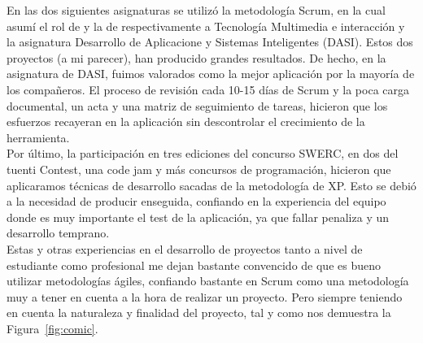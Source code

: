 En las dos siguientes asignaturas se utilizó la metodología Scrum, en
la cual asumí el rol de  y la de 
respectivamente a Tecnología Multimedia e interacción y la asignatura
Desarrollo de Aplicacione y Sistemas Inteligentes (DASI). Estos dos
proyectos (a mi parecer), han producido grandes resultados. De hecho,
en la asignatura de DASI, fuimos valorados como la mejor aplicación
por la mayoría de los compañeros. El proceso de revisión cada 10-15
días de Scrum y la poca carga documental, un acta y una matriz de
seguimiento de tareas, hicieron que los esfuerzos recayeran en la
aplicación sin descontrolar el crecimiento de la herramienta.\\

Por último, la participación en tres ediciones del concurso SWERC, en
dos del tuenti Contest, una code jam y más concursos de programación,
hicieron que aplicaramos técnicas de desarrollo sacadas de la
metodología de XP. Esto se debió a la necesidad de producir enseguida,
confiando en la experiencia del equipo donde es muy importante el test
de la aplicación, ya que fallar penaliza y un desarrollo temprano.\\

Estas y otras experiencias en el desarrollo de proyectos tanto a nivel
de estudiante como profesional me dejan bastante convencido de que es
bueno utilizar metodologías ágiles, confiando bastante en Scrum como
una metodología muy a tener en cuenta a la hora de realizar un
proyecto. Pero siempre teniendo en cuenta la naturaleza y finalidad
del proyecto, tal y como nos demuestra la Figura~\ref{fig:comic}. \\


